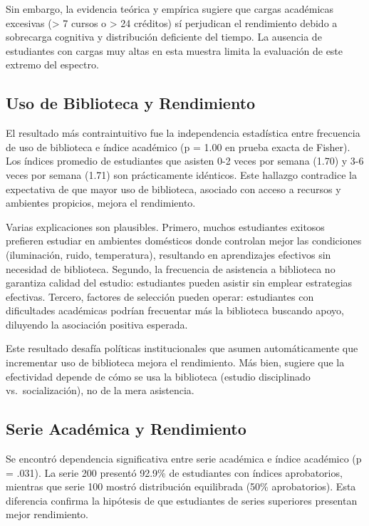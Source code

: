 \documentclass[
  stu,
  floatsintext,
  longtable,
  a4paper,
  nolmodern,
  notxfonts,
  notimes,
  12pt,
  colorlinks=true,linkcolor=blue,citecolor=blue,urlcolor=blue]{apa7}
\begin{document}
Sin embargo, la evidencia teórica y empírica sugiere que cargas
académicas excesivas (\textgreater{} 7 cursos o \textgreater{} 24
créditos) sí perjudican el rendimiento debido a sobrecarga cognitiva y
distribución deficiente del tiempo. La ausencia de estudiantes con
cargas muy altas en esta muestra limita la evaluación de este extremo
del espectro.

\subsection{Uso de Biblioteca y
Rendimiento}\label{uso-de-biblioteca-y-rendimiento}

El resultado más contraintuitivo fue la independencia estadística entre
frecuencia de uso de biblioteca e índice académico (p = 1.00 en prueba
exacta de Fisher). Los índices promedio de estudiantes que asisten 0-2
veces por semana (1.70) y 3-6 veces por semana (1.71) son prácticamente
idénticos. Este hallazgo contradice la expectativa de que mayor uso de
biblioteca, asociado con acceso a recursos y ambientes propicios, mejora
el rendimiento.

Varias explicaciones son plausibles. Primero, muchos estudiantes
exitosos prefieren estudiar en ambientes domésticos donde controlan
mejor las condiciones (iluminación, ruido, temperatura), resultando en
aprendizajes efectivos sin necesidad de biblioteca. Segundo, la
frecuencia de asistencia a biblioteca no garantiza calidad del estudio:
estudiantes pueden asistir sin emplear estrategias efectivas. Tercero,
factores de selección pueden operar: estudiantes con dificultades
académicas podrían frecuentar más la biblioteca buscando apoyo,
diluyendo la asociación positiva esperada.

Este resultado desafía políticas institucionales que asumen
automáticamente que incrementar uso de biblioteca mejora el rendimiento.
Más bien, sugiere que la efectividad depende de cómo se usa la
biblioteca (estudio disciplinado vs.~socialización), no de la mera
asistencia.

\subsection{Serie Académica y
Rendimiento}\label{serie-acaduxe9mica-y-rendimiento}

Se encontró dependencia significativa entre serie académica e índice
académico (p = .031). La serie 200 presentó 92.9\% de estudiantes con
índices aprobatorios, mientras que serie 100 mostró distribución
equilibrada (50\% aprobatorios). Esta diferencia confirma la hipótesis
de que estudiantes de series superiores presentan mejor rendimiento.
\end{document}
